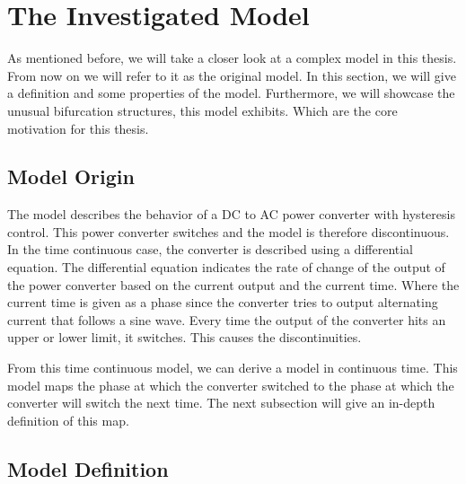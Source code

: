 \section{The Investigated Model}

As mentioned before, we will take a closer look at a complex model in this thesis.
From now on we will refer to it as the original model.
In this section, we will give a definition and some properties of the model.
Furthermore, we will showcase the unusual bifurcation structures, this model exhibits.
Which are the core motivation for this thesis.

\subsection{Model Origin}

The model describes the behavior of a DC to AC power converter with hysteresis control.
This power converter switches and the model is therefore discontinuous.
In the time continuous case, the converter is described using a differential equation.
The differential equation indicates the rate of change of the output of the power converter based on the current output and the current time.
Where the current time is given as a phase since the converter tries to output alternating current that follows a sine wave.
Every time the output of the converter hits an upper or lower limit, it switches.
This causes the discontinuities.

From this time continuous model, we can derive a model in continuous time.
This model maps the phase at which the converter switched to the phase at which the converter will switch the next time.
The next subsection will give an in-depth definition of this map.

\subsection{Model Definition}
\label{sec:og.def}

